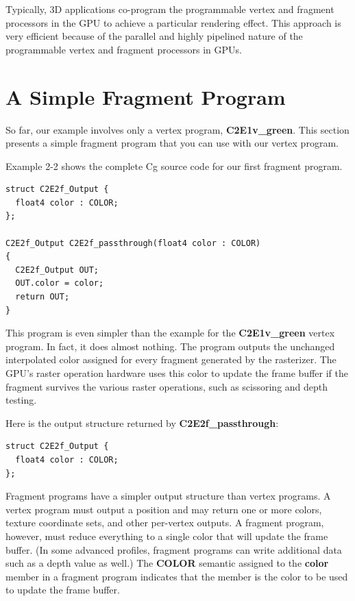 \documentclass{book}
\begin{document}
Typically, 3D applications co-program the programmable vertex and fragment processors in the GPU to achieve a particular rendering effect. This approach is very efficient because of the parallel and highly pipelined nature of the programmable vertex and fragment processors in GPUs.

\section{A Simple Fragment Program}

So far, our example involves only a vertex program, \textbf{C2E1v\_green}. This section presents a simple fragment program that you can use with our vertex program.

Example 2-2 shows the complete Cg source code for our first fragment program.

\FloatBarrier
\begin{lstlisting}[caption=Example 2-2. The \textbf{C2E2f\_passthrough} Fragment Program]
struct C2E2f_Output {
  float4 color : COLOR;
};

C2E2f_Output C2E2f_passthrough(float4 color : COLOR)
{
  C2E2f_Output OUT;
  OUT.color = color;
  return OUT;
}
\end{lstlisting}
\FloatBarrier

This program is even simpler than the example for the \textbf{C2E1v\_green} vertex program. In fact, it does almost nothing. The program outputs the unchanged interpolated color assigned for every fragment generated by the rasterizer. The GPU's raster operation hardware uses this color to update the frame buffer if the fragment survives the various raster operations, such as scissoring and depth testing.

Here is the output structure returned by \textbf{C2E2f\_passthrough}:

\FloatBarrier
\begin{lstlisting}
struct C2E2f_Output {
  float4 color : COLOR;
};
\end{lstlisting}
\FloatBarrier

Fragment programs have a simpler output structure than vertex programs. A vertex program must output a position and may return one or more colors, texture coordinate sets, and other per-vertex outputs. A fragment program, however, must reduce everything to a single color that will update the frame buffer. (In some advanced profiles, fragment programs can write additional data such as a depth value as well.) The \textbf{COLOR} semantic assigned to the \textbf{color} member in a fragment program indicates that the member is the color to be used to update the frame buffer.
\end{document}

